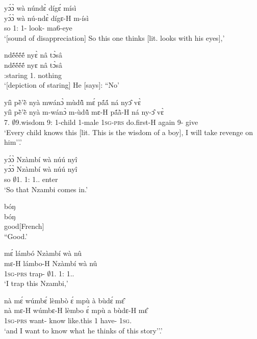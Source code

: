 \begin{exe}[(N234)]
\exN\label{n104}
  \glll [clicking] yɔ́ɔ̀ wà núndɛ̀ dígɛ́ mísì  \\
     [clicking] yɔ́ɔ̀ wà nú-ndɛ̀ dígɛ-H m-ísì \\
      [clicking] so 1:{\ATT}  1-{\ANA} look-{\R} ma6-eye \\
    \trans `[sound of disappreciation] So this one thinks [lit. looks with his eyes],'
 
\exN\label{n105}
  \glll ndẽ́ẽ́ẽ́ẽ́ nyɛ̀ nâ tɔ̀sâ \\
       ndẽ́ẽ́ẽ́ẽ́ nyɛ nâ tɔ̀sâ \\
      {\IDEO}:staring 1.{\SBJ}  {\COMP} nothing   \\
    \trans `[depiction of staring] He [says]: ``No'
 
\exN\label{n106}
  \glll yíì pẽ̀'ẽ̀ nyà mwánɔ̀ mùdũ̂ mɛ́ pã́ã́ ná nyɔ̂ vɛ̀ \\
       yíì pẽ̀'ẽ̀ nyà m-wánɔ̀ m-ùdũ̂ mɛ-H pã́ã̀-H ná ny-ɔ̂ vɛ̀ \\
      7.{\COP} $\emptyset$9.wisdom 9:{\ATT}  {\N}1-child {\N}1-male  1\textsc{sg}-\textsc{prs} do.first-H again 9-{\OBJ} give  \\
    \trans `Every child knows this [lit. This is the wisdom of a boy], I will take revenge on him''.'
 
\exN\label{n107}
  \glll yɔ́ɔ̀ Nzàmbí wà núú nyî \\
       yɔ́ɔ̀ Nzàmbí wà núú nyî \\
        so $\emptyset$1.{\PN}  1:{\ATT}  1.{\DEM}.{\DIST} enter \\
    \trans `So that Nzambi comes in.'
 
\exN\label{n108}
  \glll bóŋ \\
        bóŋ \\
        good[French] \\
    \trans ``Good.'
 
\exN\label{n109}
  \glll mɛ́ lámbó Nzàmbí wà nû \\
       mɛ-H lámbo-H Nzàmbí wà nû \\
        1\textsc{sg}-\textsc{prs} trap-{\R} $\emptyset$1.{\PN}  1:{\ATT}  1.{\DEM}.{\PROX} \\
    \trans `I trap this Nzambi,'
 
\exN\label{n110} 
  \glll nà mɛ́ wúmbɛ́ lèmbò ɛ́ mpù à bùdɛ́ mɛ̂ \\
          nà mɛ-H wúmbɛ-H lèmbo ɛ́ mpù a bùdɛ-H mɛ̂ \\
       {\CONJ} 1\textsc{sg}-\textsc{prs} want-{\R} know {\LOC} like.this 1 have-{\R} 1\textsc{sg}.{\OBJ}  \\
    \trans `and I want to know what he thinks of this story''.'
 

\end{exe}
